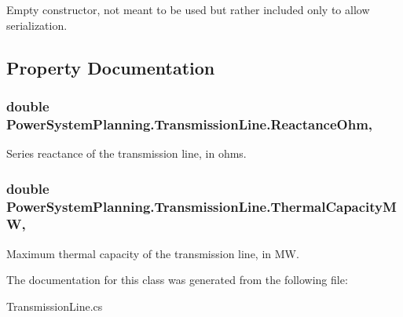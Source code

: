 Empty constructor, not meant to be used but rather included only to allow serialization. 



\subsection{Property Documentation}
\subsubsection[{\texorpdfstring{Reactance\+Ohm}{ReactanceOhm}}]{\setlength{\rightskip}{0pt plus 5cm}double Power\+System\+Planning.\+Transmission\+Line.\+Reactance\+Ohm\hspace{0.3cm}{\ttfamily [get]}, {\ttfamily [set]}}\hypertarget{class_power_system_planning_1_1_transmission_line_acaa88f661cda6aa13361691f2409f3ef}{}\label{class_power_system_planning_1_1_transmission_line_acaa88f661cda6aa13361691f2409f3ef}


Series reactance of the transmission line, in ohms. 

\subsubsection[{\texorpdfstring{Thermal\+Capacity\+MW}{ThermalCapacityMW}}]{\setlength{\rightskip}{0pt plus 5cm}double Power\+System\+Planning.\+Transmission\+Line.\+Thermal\+Capacity\+MW\hspace{0.3cm}{\ttfamily [get]}, {\ttfamily [set]}}\hypertarget{class_power_system_planning_1_1_transmission_line_a0b11d55d8f8c39bb3f49133f02091f3c}{}\label{class_power_system_planning_1_1_transmission_line_a0b11d55d8f8c39bb3f49133f02091f3c}


Maximum thermal capacity of the transmission line, in MW. 



The documentation for this class was generated from the following file\+:\begin{DoxyCompactItemize}
\item 
Transmission\+Line.\+cs\end{DoxyCompactItemize}
